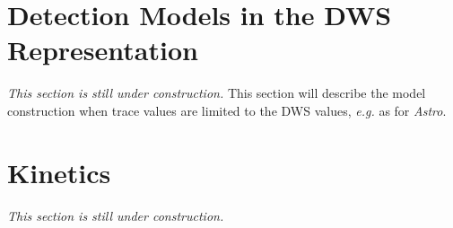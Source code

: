 \documentclass[10pt]{article}
\newcommand{\eg}{\emph{e.g.}}
\newcommand{\dws}{{\small DWS}}
\begin{document}
\section{Detection Models in the DWS Representation}
\label{sec:photonics_dws}

\emph{This section is still under construction.}
This section will describe the model construction when trace values are limited to the \dws{} values, \eg{} as for \textit{Astro}.

\section{Kinetics}
\label{sec:kinetics}

\emph{This section is still under construction.}
\end{document}
